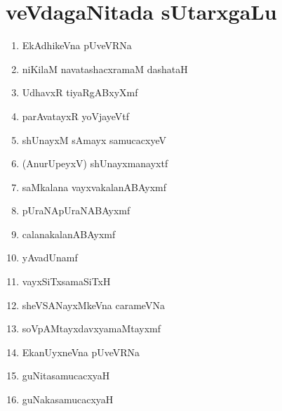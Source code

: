 \chapter{veVdagaNitada sUtarxgaLu}

\begin{enumerate}[\rm 1)]
\item EkAdhikeVna pUveVRNa

\item niKilaM navatashacxramaM dashataH

\item UdhavxR tiyaRgABxyXmf 

\item parAvatayxR yoVjayeVtf 

\item shUnayxM sAmayx samucacxyeV

\item (AnurUpeyxV) shUnayxmanayxtf

\item saMkalana vayxvakalanABAyxmf

\item pUraNApUraNABAyxmf

\item calanakalanABAyxmf

\item yAvadUnamf

\item vayxSiTxsamaSiTxH

\item sheVSANayxMkeVna carameVNa

\item soVpAMtayxdavxyamaMtayxmf

\item EkanUyxneVna pUveVRNa

\item guNitasamucacxyaH

\item guNakasamucacxyaH
\end{enumerate}

